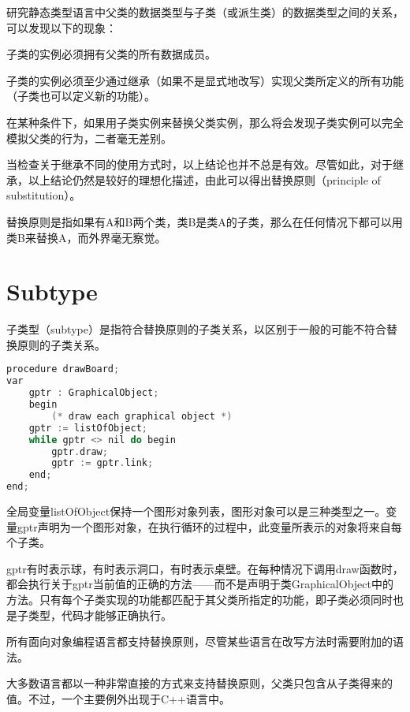 研究静态类型语言中父类的数据类型与子类（或派生类）的数据类型之间的关系，可以发现以下的现象：

\begin{compactitem}
\item 子类的实例必须拥有父类的所有数据成员。
\item 子类的实例必须至少通过继承（如果不是显式地改写）实现父类所定义的所有功能（子类也可以定义新的功能）。
\item 在某种条件下，如果用子类实例来替换父类实例，那么将会发现子类实例可以完全模拟父类的行为，二者毫无差别。
\end{compactitem}

当检查关于继承不同的使用方式时，以上结论也并不总是有效。尽管如此，对于继承，以上结论仍然是较好的理想化描述，由此可以得出替换原则（principle of substitution）。

\begin{oopquote}
替换原则是指如果有A和B两个类，类B是类A的子类，那么在任何情况下都可以用类B来替换A，而外界毫无察觉。
\end{oopquote}

\chapter{Subtype}

子类型（subtype）是指符合替换原则的子类关系，以区别于一般的可能不符合替换原则的子类关系。



\begin{lstlisting}[language=C++]
procedure drawBoard;
var
	gptr : GraphicalObject;
	begin
		(* draw each graphical object *)
	gptr := listOfObject;
	while gptr <> nil do begin
		gptr.draw;
		gptr := gptr.link;
	end;
end;
\end{lstlisting}

全局变量listOfObject保持一个图形对象列表，图形对象可以是三种类型之一。变量gptr声明为一个图形对象，在执行循环的过程中，此变量所表示的对象将来自每个子类。

gptr有时表示球，有时表示洞口，有时表示桌壁。在每种情况下调用draw函数时，都会执行关于gptr当前值的正确的方法——而不是声明于类GraphicalObject中的方法。只有每个子类实现的功能都匹配于其父类所指定的功能，即子类必须同时也是子类型，代码才能够正确执行。

所有面向对象编程语言都支持替换原则，尽管某些语言在改写方法时需要附加的语法。

大多数语言都以一种非常直接的方式来支持替换原则，父类只包含从子类得来的值。不过，一个主要例外出现于C++语言中。

